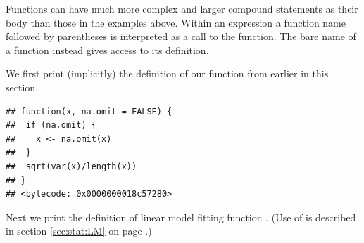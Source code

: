 \documentclass[krantz2]{krantz}\usepackage{knitr}%
\begin{document}
Functions can have much more complex and larger compound statements as their body than those in the examples above. Within an expression a function name followed by parentheses is interpreted as a call to the function. The bare name of a function instead gives access to its definition.

We first print (implicitly) the definition of our function from earlier in this section.

\begin{knitrout}\footnotesize
{}\color{fgcolor}\begin{kframe}
\begin{alltt}
\end{alltt}
\begin{verbatim}
## function(x, na.omit = FALSE) {
##  if (na.omit) {
##    x <- na.omit(x)
##  }
##  sqrt(var(x)/length(x))
## }
## <bytecode: 0x0000000018c57280>
\end{verbatim}
\end{kframe}
\end{knitrout}

Next we print the definition of \Rlang linear model fitting function . (Use of  is described in section \ref{sec:stat:LM} on page \pageref{sec:stat:LM}.)
\end{document}
